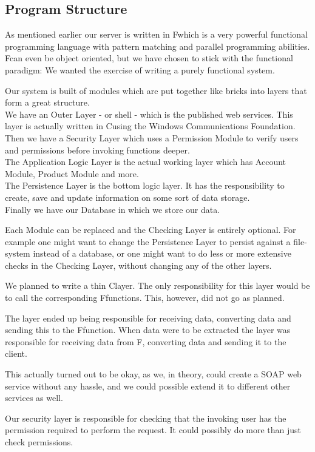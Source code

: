 \subsection{Program Structure}
As mentioned earlier our server is written in F\Sh which is a very powerful functional programming language with pattern matching and parallel programming abilities.
F\Sh can even be object oriented, but we have chosen to stick with the functional paradigm: We wanted the exercise of writing a purely functional system.

Our system is built of modules which are put together like bricks into layers that form a great structure.
\\We have an Outer Layer - or shell - which is the published web services. This layer is actually written in C\Sh using the Windows Communications Foundation.
\\Then we have a Security Layer which uses a Permission Module to verify users and permissions before invoking functions deeper.
\\The Application Logic Layer is the actual working layer which has Account Module, Product Module and more.
\\The Persistence Layer is the bottom logic layer. It has the responsibility to create, save and update information on some sort of data storage.
\\Finally we have our Database in which we store our data.

Each Module can be replaced and the Checking Layer is entirely optional. For example one might want to change the Persistence Layer to persist against a file-system instead of a database, or one might want to do less or more extensive checks in the Checking Layer, without changing any of the other layers.

We planned to write a thin C\Sh layer. The only responsibility for this layer would be to call the corresponding F\Sh functions. This, however, did not go as planned.

The layer ended up being responsible for receiving data, converting data and sending this to the F\Sh function. When data were to be extracted the layer was responsible for receiving data from F\Sh, converting data and sending it to the client.

This actually turned out to be okay, as we, in theory, could create a SOAP web service without any hassle, and we could possible extend it to different other services as well.

Our security layer is responsible for checking that the invoking user has the permission required to perform the request. It could possibly do more than just check permissions.

